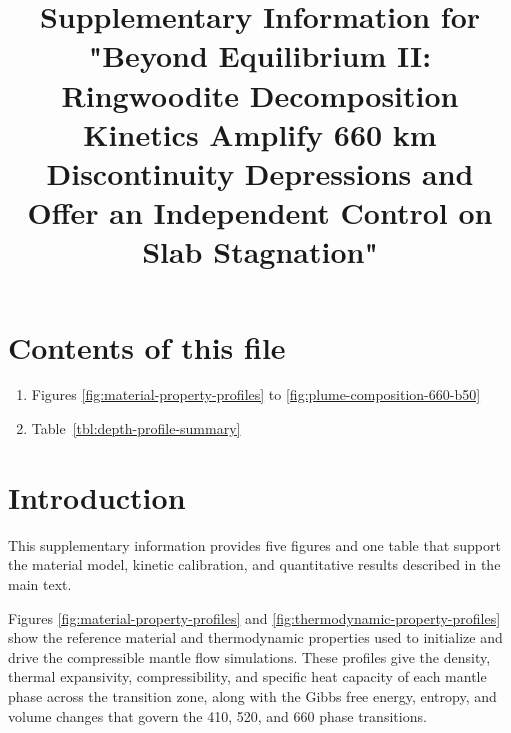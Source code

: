 \documentclass[final]{agujournal2019}
\providecommand{\tightlist}{\setlength{\itemsep}{0pt}\setlength{\parskip}{0pt}}
\let\oldtitle\title
\renewcommand{\title}[1]{\oldtitle{#1}\thispagestyle{front}}
\begin{document}
\title{Supplementary Information for "Beyond Equilibrium II: Ringwoodite
Decomposition Kinetics Amplify 660 km Discontinuity Depressions and
Offer an Independent Control on Slab Stagnation"}




\section*{Contents of this file}\label{sec:contents}

\begin{enumerate}
\def\labelenumi{\arabic{enumi}.}
\tightlist
\item
  Figures \ref{fig:material-property-profiles} to
  \ref{fig:plume-composition-660-b50}
\item
  Table~\ref{tbl:depth-profile-summary}
\end{enumerate}

\clearpage

\section*{Introduction}\label{sec:introduction}

This supplementary information provides five figures and one table that
support the material model, kinetic calibration, and quantitative
results described in the main text.

Figures \ref{fig:material-property-profiles} and
\ref{fig:thermodynamic-property-profiles} show the reference material
and thermodynamic properties used to initialize and drive the
compressible mantle flow simulations. These profiles give the density,
thermal expansivity, compressibility, and specific heat capacity of each
mantle phase across the transition zone, along with the Gibbs free
energy, entropy, and volume changes that govern the 410, 520, and 660
phase transitions.
\end{document}
